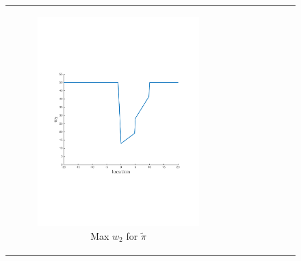 \documentclass[letterpaper]{article}
\begin{document}
{\centering
    \begin{figure}[]
        \begin{tabular}{cc}
            \begin{subfigure}{0.45\columnwidth}
                \centering
                \includegraphics[width=\columnwidth,height=0.12\textheight]{robot_opt_new}
                \caption{Max {\footnotesize $w_2$} for $ \tilde{\pi} $}
                \label{fig:navigation_opt}
            \end{subfigure} &            
            \begin{subfigure}{0.45\columnwidth}
                \centering

\end{subfigure}
\end{tabular}
\end{figure}}
\end{document}
